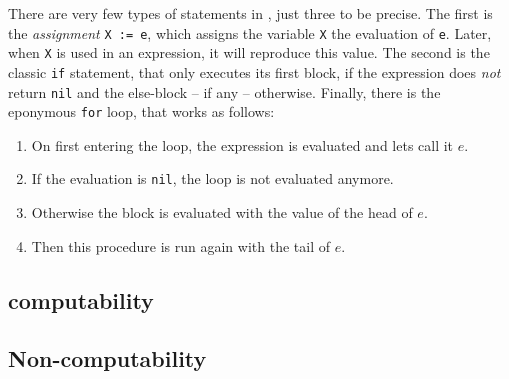 There are very few types of statements in \FOR, just three to be precise. The 
first is the {\em assignment} {\tt X := e}, which assigns the variable {\tt X}
the evaluation of {\tt e}. Later, when {\tt X} is used in an expression, it 
will reproduce this value. The second is the classic {\tt if} statement, that 
only executes its first block, if the expression does {\em not} return {\tt nil} 
and the else-block -- if any -- otherwise. Finally, there is the eponymous 
{\tt for} loop, that works as follows:

\begin{enumerate}
	\item On first entering the loop, the expression is evaluated and lets call 
		it $e$.
	\item If the evaluation is {\tt nil}, the loop is not evaluated anymore.
	\item Otherwise the block is evaluated with the value of the head of $e$.
	\item Then this procedure is run again with the tail of $e$.
\end{enumerate}

\subsection{\FOR computability}
\subsection{Non-\FOR computability}
